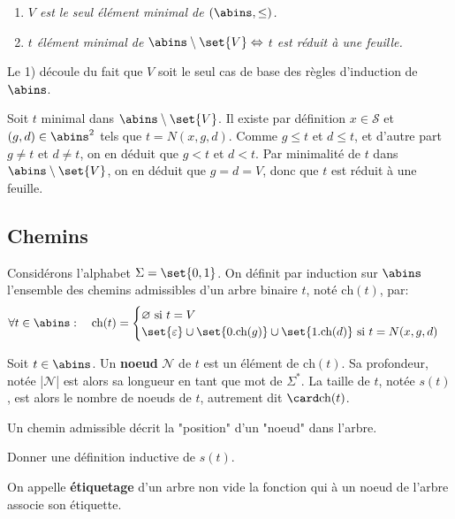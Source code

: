 \documentclass{scrartcl}
\begin{document}
			\begin{enumerate}
				\item \textsl{$V$ est le seul élément minimal de $(\abins, \leq)$.}
				\item \textsl{$t$ élément minimal de $\abins\setminus\set{V} \Leftrightarrow$ $t$ est réduit à une feuille.}
			\end{enumerate}
			\begin{demo}
				\item Le 1) découle du fait que $V$ soit le seul cas de base des règles d'induction de $\abins$.
				\item Soit $t$ minimal dans $\abins\setminus\set{V}$. 
				Il existe par définition $x \in \mathcal{S}$ et $(g,d) \in \abins^2$ tels que $t = N(x,g,d)$.
				Comme $g \leq t$ et $d \leq t$, et d'autre part $g \neq t$ et $d \neq t$,
				on en déduit que $g < t$ et $d < t$. 
				Par minimalité de $t$ dans $\abins\setminus\set{V}$, on en déduit que $g = d =V$,
				donc que $t$ est réduit à une feuille.
			\end{demo}

		\subsection{Chemins}
			Considérons l'alphabet $\Sigma = \set{0,1}$. 
			On définit par induction sur $\abins$ l'ensemble des chemins admissibles d'un arbre binaire $t$,
			noté $\text{ch}(t)$, par:
			\[
				\forall t \in \abins: \quad \text{ch}(t) = 
				\begin{cases}
					\varnothing \text{ si } t = V \\ 
					\set{\varepsilon}\cup\set{0.\text{ch}(g)}\cup\set{1.\text{ch}(d)} \text{ si } t = N(x,g,d)
				\end{cases}
			\]

			Soit $t \in \abins$. Un \textbf{noeud} $\mathcal{N}$ de $t$ est un élément de $\text{ch}(t)$. 
			Sa profondeur, notée |$\mathcal{N}$| est alors sa longueur en tant que mot de $\Sigma^*$.
			La taille de $t$, notée $s(t)$, est alors le nombre de noeuds de $t$, 
			autrement dit $\card\text{ch}(t)$.

			\rem Un chemin admissible décrit la "position" d'un "noeud" dans l'arbre.

			\exo Donner une définition inductive de $s(t)$.

			On appelle \textbf{étiquetage} d'un arbre non vide la fonction qui à un noeud de l'arbre associe son étiquette.
			
\end{document}
